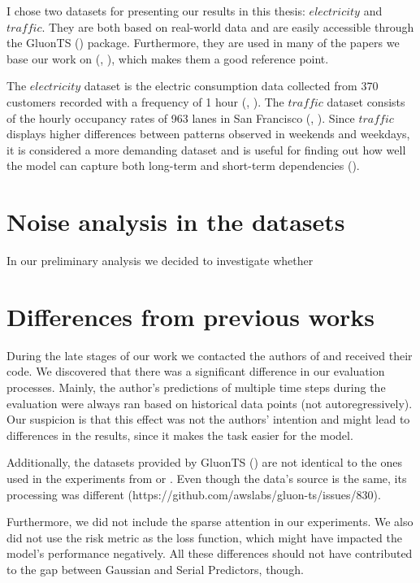\documentclass[en]{pracamgr}
\begin{document}
I chose two datasets for presenting our results in this thesis: $electricity$ and $traffic$. They are both based on real-world data and are easily accessible through the GluonTS (\cite{gluonts}) package. Furthermore, they are used in many of the papers we base our work on (\cite{enhancing}, \cite{deepar}), which makes them a good reference point.

The $electricity$ dataset is the electric consumption data collected from 370 customers recorded with a frequency of 1 hour (\cite{enhancing}, \cite{deepar}). The $traffic$ dataset consists of the hourly occupancy rates of 963 lanes in San Francisco (\cite{enhancing}, \cite{deepar}). Since $traffic$ displays higher differences between patterns observed in weekends and weekdays, it is considered a more demanding dataset and is useful for finding out how well the model can capture both long-term and short-term dependencies (\cite{enhancing}).


\section{Noise analysis in the datasets}

In our preliminary analysis we decided to investigate whether 



\section{Differences from previous works}\label{s:diff}

During the late stages of our work we contacted the authors of \cite{enhancing} and received their code. We discovered that there was a significant difference in our evaluation processes. 
Mainly, the author's predictions of multiple time steps during the evaluation were always ran based on historical data points (not autoregressively). Our suspicion is that this effect was not the authors' intention and might lead to differences in the results, since it makes the task easier for the model.

Additionally, the datasets provided by GluonTS (\cite{gluonts}) are not identical to the ones used in the experiments from \cite{enhancing} or \cite{deepar}. Even though the data's source is the same, its processing was different (https://github.com/awslabs/gluon-ts/issues/830).

Furthermore, we did not include the sparse attention in our experiments. We also did not use the risk metric as the loss function, which might have impacted the model's performance negatively. All these differences should not have contributed to the gap between Gaussian and Serial Predictors, though. 
\end{document}
